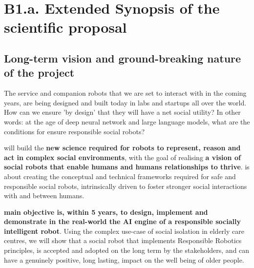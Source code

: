 
\newrefsection


\chapter{B1.a. Extended Synopsis of the scientific proposal}\label{part1}



\section{Long-term vision and ground-breaking nature of the project}

The service and companion robots that we are set to interact with in the coming
years, are being designed and built today in labs and startups all over the
world. How can we ensure 'by design' that they will have a net social utility?
In other words: at the age of deep neural network and large language models,
what are the conditions for ensure responsible social robots?

\project will build the \textbf{new science required for robots to represent, reason and
act in complex social environments}, with the goal of realising \textbf{a vision
of social robots that enable humans and humans relationships to thrive}.
\project is about creating the conceptual and technical frameworks required for
safe and responsible social robots, intrinsically driven to foster stronger
social interactions with and between humans.

\textbf{\project main objective is, within 5
years, to design, implement and demonstrate in the real-world the AI engine of a
responsible socially intelligent robot}. Using the complex use-case of social
isolation in elderly care centres, we will show that a social robot that
implements Responsible Robotics principles, is accepted and adopted on the long
term by the stakeholders, and can have a genuinely positive, long lasting,
impact on the well being of older people.

